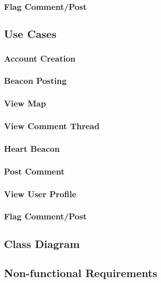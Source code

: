         \subsubsection{Flag Comment/Post}

    \subsection{Use Cases}
        \subsubsection{Account Creation}
        \subsubsection{Beacon Posting}
        \subsubsection{View Map}
        \subsubsection{View Comment Thread}
        \subsubsection{Heart Beacon}
        \subsubsection{Post Comment}
        \subsubsection{View User Profile}
        \subsubsection{Flag Comment/Post}


    \subsection{Class Diagram}

    \subsection{Non-functional Requirements}

